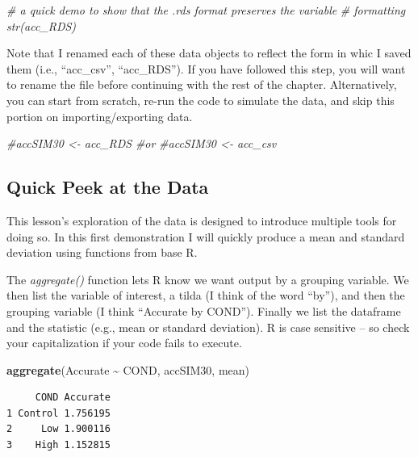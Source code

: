 \documentclass[
  11pt,
]{book}
\newenvironment{Shaded}{\begin{snugshade}}{\end{snugshade}}
\newcommand{\CommentTok}[1]{\textcolor[rgb]{0.37,0.37,0.37}{\textit{#1}}}
\newcommand{\FunctionTok}[1]{\textcolor[rgb]{0.27,0.27,0.27}{\textbf{#1}}}
\newcommand{\NormalTok}[1]{#1}
\newcommand{\SpecialCharTok}[1]{\textcolor[rgb]{0.43,0.43,0.43}{\textbf{#1}}}
\begin{document}
\begin{Shaded}
\begin{Highlighting}[]
\CommentTok{\# a quick demo to show that the .rds format preserves the variable}
\CommentTok{\# formatting str(acc\_RDS)}
\end{Highlighting}
\end{Shaded}

Note that I renamed each of these data objects to reflect the form in whic I saved them (i.e., ``acc\_csv'', ``acc\_RDS''). If you have followed this step, you will want to rename the file before continuing with the rest of the chapter. Alternatively, you can start from scratch, re-run the code to simulate the data, and skip this portion on importing/exporting data.

\begin{Shaded}
\begin{Highlighting}[]
\CommentTok{\#accSIM30 \textless{}{-} acc\_RDS}
\CommentTok{\#or}
\CommentTok{\#accSIM30 \textless{}{-} acc\_csv}
\end{Highlighting}
\end{Shaded}

\hypertarget{quick-peek-at-the-data-3}{%
\subsection{Quick Peek at the Data}\label{quick-peek-at-the-data-3}}

This lesson's exploration of the data is designed to introduce multiple tools for doing so. In this first demonstration I will quickly produce a mean and standard deviation using functions from base R.

The \emph{aggregate()} function lets R know we want output by a grouping variable. We then list the variable of interest, a tilda (I think of the word ``by''), and then the grouping variable (I think ``Accurate by COND''). Finally we list the dataframe and the statistic (e.g., mean or standard deviation). R is case sensitive -- so check your capitalization if your code fails to execute.

\begin{Shaded}
\begin{Highlighting}[]
\FunctionTok{aggregate}\NormalTok{(Accurate }\SpecialCharTok{\textasciitilde{}}\NormalTok{ COND, accSIM30, mean)}
\end{Highlighting}
\end{Shaded}

\begin{verbatim}
     COND Accurate
1 Control 1.756195
2     Low 1.900116
3    High 1.152815
\end{verbatim}
\end{document}
